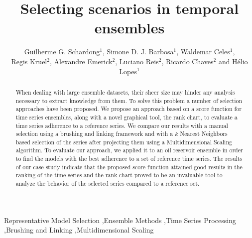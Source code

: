 \documentclass[final,5p,times,twocolumn]{elsarticle}
\begin{document}
\begin{frontmatter}



\title{Selecting scenarios in temporal ensembles}

\author{Guilherme G. Schardong$^1$, Simone D. J. Barbosa$^1$, Waldemar Celes$^1$, \\
Regis Kruel$^2$, Alexandre Emerick$^2$, Luciano Reis$^2$, Ricardo Chaves$^2$ and H\'{e}lio Lopes$^1$}


\address{$^1$Departamento de Inform\'{a}tica - PUC-Rio\\
$^2$PETROBRAS\\}

\begin{abstract}
When dealing with large ensemble datasets, their sheer size may hinder any analysis necessary to extract knowledge from them. To solve this problem a number of selection approaches have been proposed. We propose an approach based on a score function for time series ensembles, along with a novel graphical tool, the rank chart, to evaluate a time series adherence to a reference series. We compare our results with a manual selection using a brushing and linking framework and with a $k$ Nearest Neighbors based selection of the series after projecting them using a Multidimensional Scaling algorithm. To evaluate our approach, we applied it to an oil reservoir ensemble in order to find the models with the best adherence to a set of reference time series. The results of our case study indicate that the proposed score function attained good results in the ranking of the time series and the rank chart proved to be an invaluable tool to analyze the behavior of the selected series compared to a reference set.
\end{abstract}

\begin{keyword}
  Representative Model Selection
  \sep Ensemble Methods
  \sep Time Series Processing
  \sep Brushing and Linking
  \sep Multidimensional Scaling
\end{keyword}

\end{frontmatter}
\end{document}
